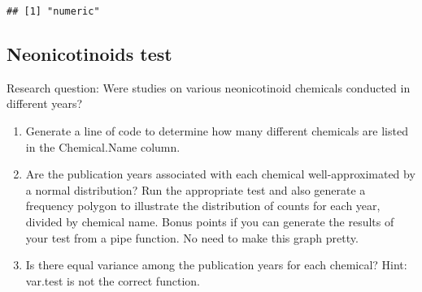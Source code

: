 \documentclass[]{article}
\newenvironment{Shaded}{\begin{snugshade}}{\end{snugshade}}
\newcommand{\KeywordTok}[1]{\textcolor[rgb]{0.13,0.29,0.53}{\textbf{#1}}}
\newcommand{\DataTypeTok}[1]{\textcolor[rgb]{0.13,0.29,0.53}{#1}}
\newcommand{\DecValTok}[1]{\textcolor[rgb]{0.00,0.00,0.81}{#1}}
\newcommand{\StringTok}[1]{\textcolor[rgb]{0.31,0.60,0.02}{#1}}
\newcommand{\CommentTok}[1]{\textcolor[rgb]{0.56,0.35,0.01}{\textit{#1}}}
\newcommand{\OperatorTok}[1]{\textcolor[rgb]{0.81,0.36,0.00}{\textbf{#1}}}
\newcommand{\NormalTok}[1]{#1}
\begin{document}
\begin{verbatim}
## [1] "numeric"
\end{verbatim}

\begin{Shaded}
\end{Shaded}

\subsection{Neonicotinoids test}\label{neonicotinoids-test}

Research question: Were studies on various neonicotinoid chemicals
conducted in different years?

\begin{enumerate}
\def\labelenumi{\arabic{enumi}.}
\setcounter{enumi}{2}
\item
  Generate a line of code to determine how many different chemicals are
  listed in the Chemical.Name column.
\item
  Are the publication years associated with each chemical
  well-approximated by a normal distribution? Run the appropriate test
  and also generate a frequency polygon to illustrate the distribution
  of counts for each year, divided by chemical name. Bonus points if you
  can generate the results of your test from a pipe function. No need to
  make this graph pretty.
\item
  Is there equal variance among the publication years for each chemical?
  Hint: var.test is not the correct function.
\end{enumerate}

\begin{Shaded}
\end{Shaded}
\end{document}
